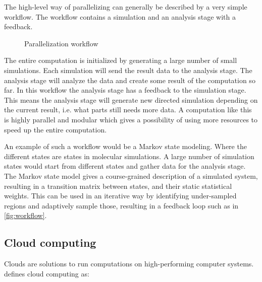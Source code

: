 The high-level way of parallelizing can generally be described by a very
simple workflow. The workflow contains a simulation and an analysis
stage with a feedback. 

\begin{figure}[H]  
  \centering
  \caption{Parallelization workflow}
  \label{fig:workflow}
\end{figure}

The entire computation is initialized by generating a large number of
small simulations. Each simulation will send the result data to the
analysis stage. The analysis stage will analyze the data and create
some result of the computation so far. In this workflow the analysis
stage has a feedback to the simulation stage. This means the analysis
stage will generate new directed simulation depending on the current
result, i.e. what parts still needs more data. A computation like this
is highly parallel and modular which gives a possibility of using more
resources to speed up the entire computation.

An example of such a workflow would be a Markov state modeling. Where
the different states are states in molecular simulations. A large
number of simulation states would start from different states and
gather data for the analysis stage. The Markov state model gives a
course-grained description of a simulated system, resulting in a
transition matrix between states, and their static statistical
weights. This can be used in an iterative way by identifying
under-sampled regions and adaptively sample those, resulting in a
feedback loop such as in \autoref{fig:workflow}.




\subsection{Cloud computing}
Clouds are solutions to run computations on high-performing computer
systems. \citet{foster:2008} defines cloud computing as:

